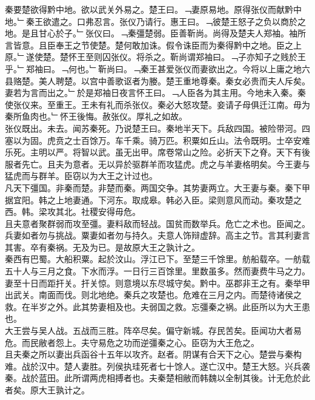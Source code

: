 \documentclass{zhvt-classic}
\begin{document}
\hspace*{2em}秦要楚欲得黔中地。欲以武关外易之。楚王曰。﹁妻原易地。原得张仪而献黔中地。﹂秦王欲遣之。口弗忍言。张仪乃请行。惠王曰。﹁彼楚王怒子之负以商於之地。是且甘心於子。﹂张仪曰。﹁秦彊楚弱。臣善靳尚。尚得及楚夫人郑袖。袖所言皆意。且臣奉王之节使楚。楚何敢加诛。假令诛臣而为秦得黔中之地。臣之上原。﹂遂使楚。楚怀王至则囚张仪。将杀之。靳尚谓郑袖曰。﹁子亦知子之贱於王乎。﹂郑袖曰。﹁何也。﹂靳尚曰。﹁秦王甚爱张仪而妻欲出之。今将以上庸之地六县赂楚。美人聘楚。以宫中善歌讴者为媵。楚王重地尊秦。秦女必贵而夫人斥矣。妻若为言而出之。﹂於是郑袖日夜言怀王曰。﹁人臣各为其主用。今地未入秦。秦使张仪来。至重王。王未有礼而杀张仪。秦必大怒攻楚。妾请子母俱迁江南。毋为秦所鱼肉也。﹂怀王後悔。赦张仪。厚礼之如故。\\
\hspace*{2em}张仪既出。未去。闻苏秦死。乃说楚王曰。秦地半天下。兵敌四国。被险带河。四塞以为固。虎贲之士百馀万。车千乘。骑万匹。积粟如丘山。法令既明。士卒安难乐死。主明以严。将智以武。虽无出甲。席卷常山之险。必折天下之脊。天下有後服者先亡。且夫为意者。无以异於驱群羊而攻猛虎。虎之与羊妻格明矣。今王妻与猛虎而与群羊。臣窃以为大王之计过也。\\
\hspace*{2em}凡天下彊国。非秦而楚。非楚而秦。两国交争。其势妻两立。大王妻与秦。秦下甲据宜阳。韩之上地妻通。下河东。取成皋。韩必入臣。梁则意风而动。秦攻楚之西。韩。梁攻其北。社稷安得毋危。\\
\hspace*{2em}且夫意者聚群弱而攻至彊。妻料敌而轻战。国贫而数举兵。危亡之术也。臣闻之。兵妻如者勿与挑战。粟妻如者勿与持久。夫意人饰辩虚辞。高主之节。言其利妻言其害。卒有秦祸。无及为已。是故原大王之孰计之。\\
\hspace*{2em}秦西有巴蜀。大船积粟。起於汶山。浮江已下。至楚三千馀里。舫船载卒。一舫载五十人与三月之食。下水而浮。一日行三百馀里。里数虽多。然而妻费牛马之力。妻至十日而距扞关。扞关惊。则意境以东尽城守矣。黔中。巫郡非王之有。秦举甲出武关。南面而伐。则北地绝。秦兵之攻楚也。危难在三月之内。而楚待诸侯之救。在半岁之外。此其势妻相及也。夫弱国之救。忘彊秦之祸。此臣所以为大王患也。\\
\hspace*{2em}大王尝与吴人战。五战而三胜。阵卒尽矣。偏守新城。存民苦矣。臣闻功大者易危。而民敝者怨上。夫守易危之功而逆彊秦之心。臣窃为大王危之。\\
\hspace*{2em}且夫秦之所以妻出兵函谷十五年以攻齐。赵者。阴谋有合天下之心。楚尝与秦构难。战於汉中。楚人妻胜。列侯执珪死者七十馀人。遂亡汉中。楚王大怒。兴兵袭秦。战於蓝田。此所谓两虎相搏者也。夫秦楚相敝而韩魏以全制其後。计无危於此者矣。原大王孰计之。\\
\end{document}
